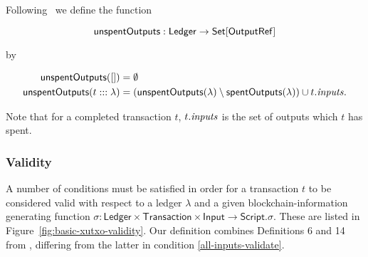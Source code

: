 \documentclass[a4paper]{article}
\theoremstyle{definition}  %
\begin{document}
\noindent Following~\cite{Zahnentferner18-UTxO} we define the function

\[
  \mathsf{unspentOutputs} : \mathsf{Ledger} \rightarrow \mathsf{Set[OutputRef]}
\]

\noindent by

\begin{align*}
   \mathsf{unspentOutputs}([]) &=\emptyset \\
   \mathsf{unspentOutputs}(t:::\lambda) &= (\mathsf{unspentOutputs}(\lambda) \setminus \mathsf{spentOutputs}(\lambda)) \cup t.\mathit{inputs}.
\end{align*}

\noindent Note that for a completed transaction $t$, $t.\mathit{inputs}$ is the set of outputs which $t$ has spent.

\subsubsection{Validity}
A number of conditions must be satisfied in order for a transaction
$t$ to be considered valid with respect to a ledger $\lambda$ and a
given blockchain-information generating function $\sigma :
\mathsf{Ledger} \times \mathsf{Transaction} \times \mathsf{Input}
\rightarrow \mathsf{Script}$.$\sigma$.  These are listed in
Figure~\ref{fig:basic-xutxo-validity}.  Our definition combines
Definitions 6 and 14 from \cite{Zahnentferner18-UTxO}, differing from
the latter in condition \ref{all-inputs-validate}.
\end{document}
